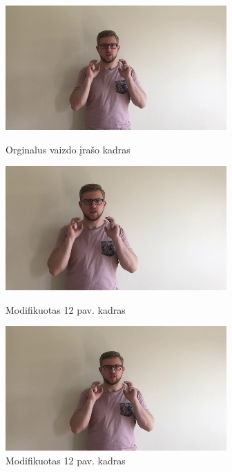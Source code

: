 \documentclass{VUMIFPSbakalaurinis}
\begin{document}
\begin{figure}[H]
	\centering
	\begin{minipage}{.27\textwidth}
		\centering
		\includegraphics[width=.8\linewidth]{img/other/org}
		\caption[a]{Orginalus vaizdo įrašo kadras}
		\label{img:lgk10-1}
	\end{minipage}
	\qquad
	\begin{minipage}{.27\textwidth}
		\centering
		\includegraphics[width=.8\linewidth]{img/other/m1}
		\caption[b]{Modifikuotas 12 pav. kadras}
		\label{img:lgk10-2}
	\end{minipage}%
	\qquad
	\begin{minipage}{.27\textwidth}
		\centering
		\includegraphics[width=.8\linewidth]{img/other/m2}
		\caption[c]{Modifikuotas 12 pav. kadras}
		\label{img:lgk10-3}
	\end{minipage}
\end{figure}
\end{document}

